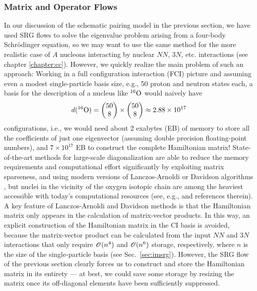 {\subsubsection{\label{sec:srg_opflow}Matrix and Operator Flows}
In our discussion of the schematic pairing model in the previous section, we 
have used SRG flows to solve the eigenvalue problem arising from a four-body 
Schr\"odinger equation, so we may want to use the same method for the more 
realistic case of $A$ nucleons interacting by nuclear $NN$, $3N$, etc. 
interactions (see chapter \ref{chapter:cc}). However, we quickly realize the
main problem of such an approach: Working in a full configuration interaction (FCI) 
picture
and assuming even a modest single-particle basis size, e.g., 50 proton and neutron 
states each, a basis for the description of a nucleus like $\nuc{O}{16}$ would 
naively have
\begin{equation}
 d(\nuc{O}{16}) = \begin{pmatrix} 50 \\ 8\end{pmatrix} \times 
           \begin{pmatrix} 50 \\ 8\end{pmatrix}
                \approx 2.88\times10^{17}
\end{equation}
configurations, i.e., we would need about 2 exabytes (EB) of memory to store all 
the coefficients of just one eigenvector (assuming double precision floating-point 
numbers), and $7\times10^{17}$ EB to construct
the complete Hamiltonian matrix! State-of-the-art methods for large-scale 
diagonalization are able to reduce the memory requirements and computational
effort significantly by exploiting matrix sparseness, and using modern versions of
Lanczos-Arnoldi \cite{Lanczos:1950sp,Arnoldi:1951kk} or Davidson algorithms 
\cite{Davidson:1989pi}, but nuclei in the vicinity of the oxygen isotopic 
chain are among the heaviest accessible with today's computational
resources (see, e.g., \cite{Yang:2013ly,Barrett:2013oq} and references therein).
A key feature of Lanczos-Arnoldi and Davidson methods is that the
Hamiltonian matrix only appears in the calculation
of matrix-vector products. In this way, an explicit construction of the Hamiltonian
matrix in the CI basis is avoided, because the matrix-vector product can be
calculated from the input $NN$ and $3N$ interactions that only require $\OC(n^4)$ 
and $\OC(n^6)$ storage, respectively, where $n$ is the size of the single-particle
basis (see Sec.~\ref{sec:imsrg}). However, the SRG flow of the previous section 
clearly forces us to construct
and store the Hamiltonian matrix in its entirety --- at best, we could save some
storage by resizing the matrix once its off-diagonal elements have been 
sufficiently suppressed.

}
